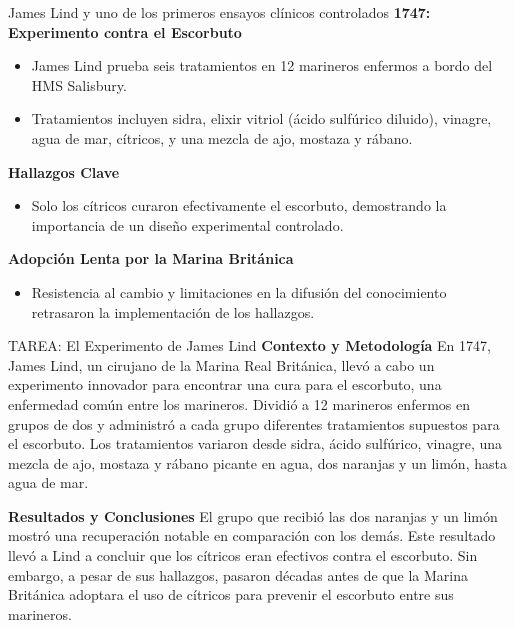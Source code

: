 ﻿\documentclass{beamer}
\begin{document}
\begin{frame}{James Lind y uno de los primeros ensayos clínicos controlados}
    \textbf{1747: Experimento contra el Escorbuto}
    \begin{itemize}
        \item James Lind prueba seis tratamientos en 12 marineros enfermos a bordo del HMS Salisbury.
        \item Tratamientos incluyen sidra, elixir vitriol (ácido sulfúrico diluido), vinagre, agua de mar, cítricos, y una mezcla de ajo, mostaza y rábano.
    \end{itemize}
    
    \textbf{Hallazgos Clave}
    \begin{itemize}
        \item Solo los cítricos curaron efectivamente el escorbuto, demostrando la importancia de un diseño experimental controlado.
    \end{itemize}

    \textbf{Adopción Lenta por la Marina Británica}
    \begin{itemize}
        \item Resistencia al cambio y limitaciones en la difusión del conocimiento retrasaron la implementación de los hallazgos.
    \end{itemize}
\end{frame}

\begin{frame}{TAREA: El Experimento de James Lind}
    \textbf{Contexto y Metodología}
    En 1747, James Lind, un cirujano de la Marina Real Británica, llevó a cabo un experimento innovador para encontrar una cura para el escorbuto, una enfermedad común entre los marineros. Dividió a 12 marineros enfermos en grupos de dos y administró a cada grupo diferentes tratamientos supuestos para el escorbuto. Los tratamientos variaron desde sidra, ácido sulfúrico, vinagre, una mezcla de ajo, mostaza y rábano picante en agua, dos naranjas y un limón, hasta agua de mar.

    \textbf{Resultados y Conclusiones}
    El grupo que recibió las dos naranjas y un limón mostró una recuperación notable en comparación con los demás. Este resultado llevó a Lind a concluir que los cítricos eran efectivos contra el escorbuto. Sin embargo, a pesar de sus hallazgos, pasaron décadas antes de que la Marina Británica adoptara el uso de cítricos para prevenir el escorbuto entre sus marineros.
\end{frame}
\end{document}
